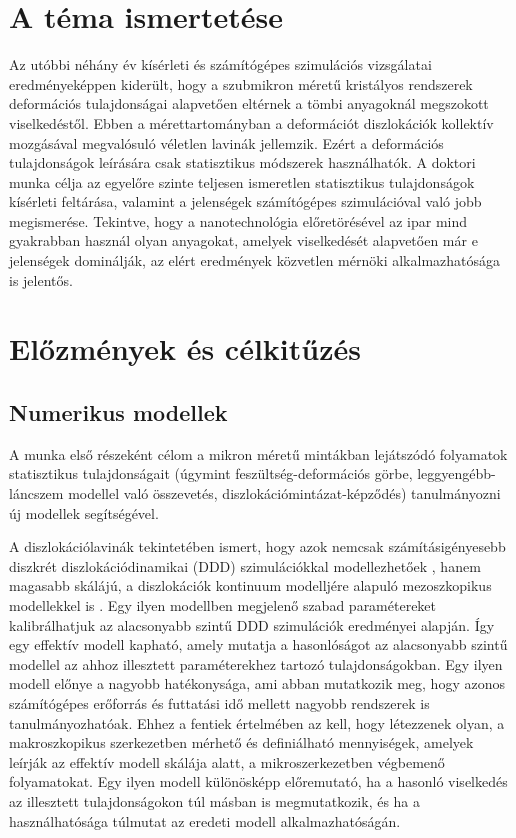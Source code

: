 
\section*{A téma ismertetése}

Az utóbbi néhány év kísérleti és számítógépes szimulációs vizsgálatai eredményeképpen kiderült, hogy a szubmikron méretű kristályos rendszerek deformációs tulajdonságai alapvetően eltérnek a tömbi anyagoknál megszokott viselkedéstől. Ebben a mérettartományban a deformációt diszlokációk kollektív mozgásával megvalósuló véletlen lavinák jellemzik\cite{Dimiduk1188}. Ezért a deformációs tulajdonságok leírására csak statisztikus módszerek használhatók. A doktori munka célja az egyelőre szinte teljesen ismeretlen statisztikus tulajdonságok kísérleti feltárása, valamint a jelenségek számítógépes szimulációval való jobb megismerése. Tekintve, hogy a nanotechnológia előretörésével az ipar mind gyakrabban használ olyan anyagokat, amelyek viselkedését alapvetően már e jelenségek dominálják, az elért eredmények közvetlen mérnöki alkalmazhatósága is jelentős.

\section*{Előzmények és célkitűzés}
\subsection*{Numerikus modellek}

A munka első részeként célom a mikron méretű mintákban lejátszódó folyamatok statisztikus tulajdonságait (úgymint feszültség-deformációs görbe, leggyengébb-láncszem modellel való összevetés, diszlokációmintázat-képződés) tanulmányozni új modellek segítségével.

A diszlokációlavinák tekintetében ismert, hogy azok nemcsak számításigényesebb diszkrét diszlokációdinamikai (DDD) szimulációkkal modellezhetőek \cite{PhysRevLett.112.235501}, hanem magasabb skálájú, a diszlokációk kontinuum modelljére alapuló mezoszkopikus modellekkel is \cite{1742-5468-2005-08-P08004}. Egy ilyen modellben megjelenő szabad paramétereket kalibrálhatjuk az alacsonyabb szintű DDD szimulációk eredményei alapján. Így egy effektív modell kapható, amely mutatja a hasonlóságot az alacsonyabb szintű modellel az ahhoz illesztett paraméterekhez tartozó tulajdonságokban. Egy ilyen modell előnye a nagyobb hatékonysága, ami abban mutatkozik meg, hogy azonos számítógépes erőforrás és futtatási idő mellett nagyobb rendszerek is tanulmányozhatóak. Ehhez a fentiek értelmében az kell, hogy létezzenek olyan, a makroszkopikus szerkezetben mérhető és definiálható mennyiségek, amelyek leírják az effektív modell skálája alatt, a mikroszerkezetben végbemenő folyamatokat. Egy ilyen modell különösképp előremutató, ha a hasonló viselkedés az illesztett tulajdonságokon túl másban is megmutatkozik, és ha a használhatósága túlmutat az eredeti modell alkalmazhatóságán.

